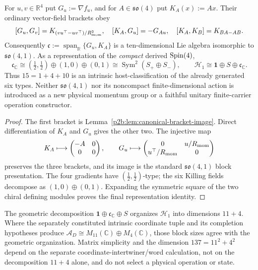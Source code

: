 \documentclass[12pt,a4paper]{article}
\begin{document}
\begin{proposition}
\label{p2b:prop:conformal-host-closure}
For \(u,v\in\mathbb R^4\) put \(G_u:=\nabla f_u\), and for
\(A\in\mathfrak{so}(4)\) put \(K_A(x):=Ax\).  Their ordinary
vector-field brackets obey
\[
 [G_u,G_v]=K_{(vu^\top-uv^\top)/R_{\mathrm{mom}}^2},\quad
 [K_A,G_u]=-G_{Au},\quad
 [K_A,K_B]=K_{BA-AB}.
\]
Consequently
\(\mathfrak c:=\operatorname{span}_{\mathbb R}\{G_u,K_A\}\)
is a ten-dimensional Lie algebra isomorphic to \(\mathfrak{so}(4,1)\).
As a representation of the \emph{compact} derived \(\mathrm{Spin}(4)\),
\[
 \mathfrak c_{\mathbb C}
 \cong(\tfrac12,\tfrac12)\oplus(1,0)\oplus(0,1)
 \cong\operatorname{Sym}^2(S_+\oplus S_-),
 \qquad \mathcal H_1\cong\mathbf1\oplus S\oplus\mathfrak c_{\mathbb C}.
\]
Thus \(15=1+4+10\) is an intrinsic host-classification of the
already generated six types.  Neither \(\mathfrak{so}(4,1)\) nor
its noncompact finite-dimensional action is introduced as a new physical
momentum group or a faithful unitary finite-carrier operation constructor.
\end{proposition}
\begin{proof}
The first bracket is Lemma~\ref{p2b:lem:canonical-bracket-image}.
Direct differentiation of \(K_A\) and \(G_u\) gives the other two.
The injective map
\[
 K_A\longmapsto\begin{pmatrix}-A&0\\0&0\end{pmatrix},\qquad
 G_u\longmapsto\begin{pmatrix}0&u/R_{\mathrm{mom}}\\u^\top/R_{\mathrm{mom}}&0\end{pmatrix}
\]
preserves the three brackets, and its image is the standard
\(\mathfrak{so}(4,1)\) block presentation.  The four gradients have
\((\tfrac12,\tfrac12)\)-type; the six Killing fields decompose as
\((1,0)\oplus(0,1)\).  Expanding the symmetric square of the two
chiral defining modules proves the final representation identity.
\end{proof}

\begin{remark}
\label{p2b:rem:conformal-block-compatibility}
The geometric decomposition
\(\mathbf1\oplus\mathfrak c_{\mathbb C}\oplus S\)
organizes \(\mathcal H_1\) into dimensions \(11+4\).
Where the separately constituted intrinsic coordinate tuple and its
completion hypotheses produce
\(\mathcal A_D\cong M_{11}(\mathbb C)\oplus M_4(\mathbb C)\),
those block sizes agree with the geometric organization.  Matrix
simplicity and the dimension \(137=11^2+4^2\) depend on the separate
coordinate-intertwiner/word calculation, not on the decomposition
\(11+4\) alone, and do not select a physical operation or state.
\end{remark}
\end{document}
